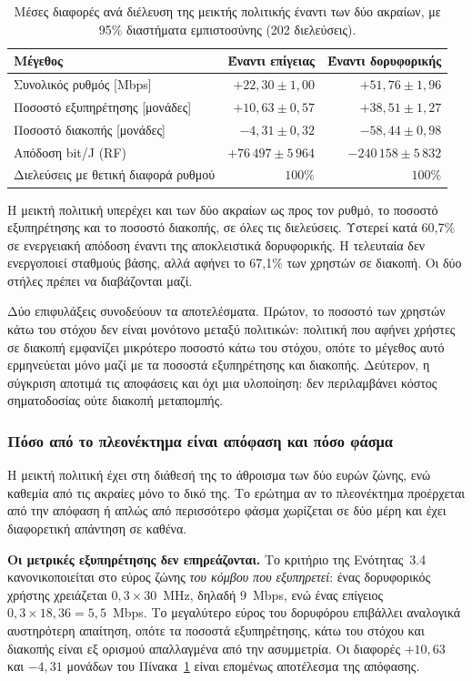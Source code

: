 \documentclass[11pt,a4paper]{article}
\begin{document}
\begin{table}[htbp]
\centering\small
\caption{Μέσες διαφορές ανά διέλευση της μεικτής πολιτικής έναντι των δύο
ακραίων, με 95\% διαστήματα εμπιστοσύνης (202 διελεύσεις).}
\label{tab:paired}
\begin{tabular}{@{}lrr@{}}
\toprule
Μέγεθος & Έναντι επίγειας & Έναντι δορυφορικής \\
\midrule
Συνολικός ρυθμός [Mbps]        & $+22{,}30 \pm 1{,}00$ & $+51{,}76 \pm 1{,}96$ \\
Ποσοστό εξυπηρέτησης [μονάδες] & $+10{,}63 \pm 0{,}57$ & $+38{,}51 \pm 1{,}27$ \\
Ποσοστό διακοπής [μονάδες]     & $-4{,}31 \pm 0{,}32$  & $-58{,}44 \pm 0{,}98$ \\
Απόδοση bit/J (RF)             & $+76\,497 \pm 5\,964$ & $-240\,158 \pm 5\,832$ \\
\midrule
Διελεύσεις με θετική διαφορά ρυθμού & $100\%$ & $100\%$ \\
\bottomrule
\end{tabular}
\end{table}

Η μεικτή πολιτική υπερέχει και των δύο ακραίων ως προς τον ρυθμό, το ποσοστό
εξυπηρέτησης και το ποσοστό διακοπής, σε όλες τις διελεύσεις. Υστερεί κατά
60,7\% σε ενεργειακή απόδοση έναντι της αποκλειστικά δορυφορικής. Η τελευταία
δεν ενεργοποιεί σταθμούς βάσης, αλλά αφήνει το 67,1\% των χρηστών σε διακοπή.
Οι δύο στήλες πρέπει να διαβάζονται μαζί.

Δύο επιφυλάξεις συνοδεύουν τα αποτελέσματα. Πρώτον, το ποσοστό των χρηστών κάτω
του στόχου δεν είναι μονότονο μεταξύ πολιτικών: πολιτική που αφήνει χρήστες σε
διακοπή εμφανίζει μικρότερο ποσοστό κάτω του στόχου, οπότε το μέγεθος αυτό
ερμηνεύεται μόνο μαζί με τα ποσοστά εξυπηρέτησης και διακοπής. Δεύτερον, η
σύγκριση αποτιμά τις αποφάσεις και όχι μια υλοποίηση: δεν περιλαμβάνει κόστος
σηματοδοσίας ούτε διακοπή μεταπομπής.

\subsubsection*{Πόσο από το πλεονέκτημα είναι απόφαση και πόσο φάσμα}

Η μεικτή πολιτική έχει στη διάθεσή της το άθροισμα των δύο ευρών ζώνης, ενώ
καθεμία από τις ακραίες μόνο το δικό της. Το ερώτημα αν το πλεονέκτημα
προέρχεται από την απόφαση ή απλώς από περισσότερο φάσμα χωρίζεται σε δύο μέρη
και έχει διαφορετική απάντηση σε καθένα.

\textbf{Οι μετρικές εξυπηρέτησης δεν επηρεάζονται.} Το κριτήριο της
Ενότητας~3.4 κανονικοποιείται στο εύρος ζώνης \emph{του κόμβου που
εξυπηρετεί}: ένας δορυφορικός χρήστης χρειάζεται $0{,}3 \times 30$~MHz, δηλαδή
$9$~Mbps, ενώ ένας επίγειος $0{,}3 \times 18{,}36 = 5{,}5$~Mbps. Το μεγαλύτερο
εύρος του δορυφόρου επιβάλλει αναλογικά αυστηρότερη απαίτηση, οπότε τα ποσοστά
εξυπηρέτησης, κάτω του στόχου και διακοπής είναι εξ ορισμού απαλλαγμένα από την
ασυμμετρία. Οι διαφορές $+10{,}63$ και $-4{,}31$ μονάδων του
Πίνακα~\ref{tab:paired} είναι επομένως αποτέλεσμα της απόφασης.
\end{document}
